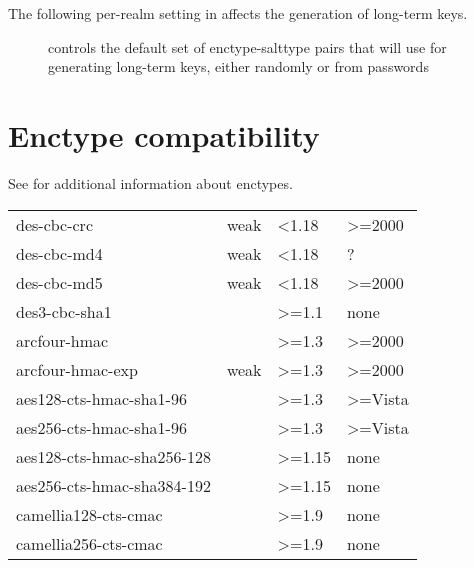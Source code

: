 \documentclass[letterpaper,10pt,english]{sphinxmanual}
\begin{document}
The following per-realm setting in {\hyperref[\detokenize{admin/conf_files/kdc_conf:kdc-conf-5}]{}} affects the
generation of long-term keys.
\begin{description}
\item[{}] \leavevmode
controls the default set of enctype-salttype pairs that {\hyperref[\detokenize{admin/admin_commands/kadmind:kadmind-8}]{}}
will use for generating long-term keys, either randomly or from
passwords

\end{description}


\section{Enctype compatibility}
\label{\detokenize{admin/enctypes:enctype-compatibility}}
See {\hyperref[\detokenize{admin/conf_files/kdc_conf:encryption-types}]{}} for additional information about enctypes.


\begin{savenotes}\sphinxattablestart
\centering
\begin{tabulary}{\linewidth}[t]{|T|T|T|T|}
\hline
{}\relax &\relax &\relax &\relax \\
\hline
des-cbc-crc
&
weak
&
\textless{}1.18
&
\textgreater{}=2000
\\
\hline
des-cbc-md4
&
weak
&
\textless{}1.18
&
?
\\
\hline
des-cbc-md5
&
weak
&
\textless{}1.18
&
\textgreater{}=2000
\\
\hline
des3-cbc-sha1
&&
\textgreater{}=1.1
&
none
\\
\hline
arcfour-hmac
&&
\textgreater{}=1.3
&
\textgreater{}=2000
\\
\hline
arcfour-hmac-exp
&
weak
&
\textgreater{}=1.3
&
\textgreater{}=2000
\\
\hline
aes128-cts-hmac-sha1-96
&&
\textgreater{}=1.3
&
\textgreater{}=Vista
\\
\hline
aes256-cts-hmac-sha1-96
&&
\textgreater{}=1.3
&
\textgreater{}=Vista
\\
\hline
aes128-cts-hmac-sha256-128
&&
\textgreater{}=1.15
&
none
\\
\hline
aes256-cts-hmac-sha384-192
&&
\textgreater{}=1.15
&
none
\\
\hline
camellia128-cts-cmac
&&
\textgreater{}=1.9
&
none
\\
\hline
camellia256-cts-cmac
&&
\textgreater{}=1.9
&
none
\\
\hline
\end{tabulary}
\par
\sphinxattableend\end{savenotes}
\end{document}
